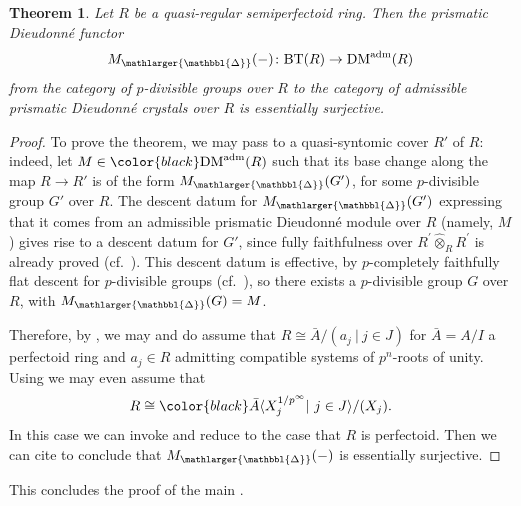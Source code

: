 \documentclass{amsart}
\newcommand{\prism}{{\mathlarger{\mathbbl{\Delta}}}}
\theoremstyle{plain}
\newtheorem{theorem}{Theorem}[subsection]
\theoremstyle{definition}
\newcommand{\DM}{\mathrm{DM}}
\newcommand{\purple}[1]{{\color{black} #1}}
\newcommand{\red}[1]{{\color{black} #1}}
\newcommand{\blue}[1]{{\color{black}#1}}
\begin{document}
\begin{theorem}
  \label{sec:essent-surj-main-theorem-equivalence-of-divided-prismatic-dieudonne-functor} \purple{Let $R$ be a quasi-regular semiperfectoid ring.} Then the prismatic Dieudonn\'e functor \red{
  $$
  M_\prism(-)\colon \mathrm{BT}(R)\to \mathrm{DM}^{\rm adm}(R)
  $$
  from the category of $p$-divisible groups over $R$ to the category of admissible} prismatic Dieudonn\'e crystals over $R$ is essentially surjective. 
\end{theorem}
\begin{proof} 
 To prove the theorem, we may pass to a quasi-syntomic cover $R'$ of $R$: indeed, let $M \in \red{\DM^{\rm adm}}(R)$ such that its base change along the map $R \to R'$ is of the form $M_{\prism}(G')$, for some $p$-divisible group $G'$ over $R$. The descent datum for $M_{\prism}(G')$ expressing that it comes from an admissible prismatic Dieudonn\'e module over $R$ (namely, $M$) gives rise to a descent datum for $G'$, since fully faithfulness over $R^\prime\hat{\otimes}_R R^\prime$ is already proved (cf.\ ). This descent datum is effective, by $p$-completely faithfully flat descent for $p$-divisible groups (cf.\ ), so there exists a $p$-divisible group $G$ over $R$, with $M_{\prism}(G)=M$.
  
 Therefore, by , we may and do assume that \blue{$R\cong \bar{A}/(a_j\ |\ j\in J)$ for $\bar{A}=A/I$} a perfectoid ring and $a_j\in R$ admitting compatible systems of $p^n$-roots of unity. Using  we may even assume that
 $$
 R\cong \blue{\bar{A}}\langle X_j^{1/p^\infty} |\ j\in J\rangle/(X_j).
 $$
 In this case we can invoke  and reduce to the case that $R$ is perfectoid. Then we can cite  to conclude that $M_\prism(-)$ is essentially surjective.
\end{proof}

This concludes the proof of the main .
\end{document}
